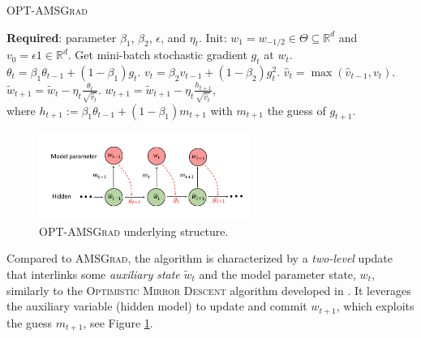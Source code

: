 \documentclass[wcp]{jmlr}
\begin{document}
\hspace{-0.2in}\begin{minipage}{0.5\linewidth}
\begin{algorithm}[H]
\begin{algorithmic}[1] 
\small
\caption{\textsc{OPT-AMSGrad}} \label{alg:optamsgrad}
\STATE \textbf{Required}: parameter $\beta_1$, $\beta_2$, $\epsilon$, and $\eta_t$. 
\STATE Init: $w_1 = w_{-1/2} \in \Theta \subseteq \mathbb R^d $ and $v_{0} = \epsilon 1 \in \mathbb R^{d}$.
\STATE Get mini-batch stochastic gradient $g_t$ at $w_t$.
\STATE $\theta_t = \beta_{1} \theta_{t-1} + (1 - \beta_{1}) g_t$.
\STATE $v_t = \beta_2 v_{t-1} + (1 - \beta_2) g_t^{2}$.
\STATE $\hat{v}_t = \max( \hat{v}_{t-1} , v_t )$. 
\STATE $\tilde{w}_{t+1} =  \tilde{w}_{t} - \eta_t \frac{\theta_t}{ \sqrt{\hat{v}_t }  } $.
\STATE $w_{t+1} = \tilde{w}_{t+1} - \eta_{t} \frac{h_{t+1}}{ \sqrt{\hat{v}_t } } $,  \\  
where $h_{t+1}:= \beta_{1} \theta_{t-1} + (1 - \beta_{1}) m_{t+1}$ with $m_{t+1}$ the guess of $g_{t+1}$. 
\ENDFOR 
\end{algorithmic}
\end{algorithm}\end{minipage}
\hfill
\begin{minipage}{0.5\linewidth}
\begin{figure}[H]
\captionsetup{justification=centering}
    \vspace{-0.1in}
    \includegraphics[width=2.7in]{plots/plot.pdf}
        \vspace{-0.1in}
    \caption{\textsc{OPT-AMSGrad} underlying structure.}
     \label{fig:scheme}
\end{figure}
\end{minipage}

\vspace{0.1in}
Compared to \textsc{AMSGrad}, the algorithm is characterized by a \emph{two-level} update that interlinks some \emph{auxiliary state} $\tilde{w}_{t}$ and the model parameter state, $w_t$, similarly to the \textsc{Optimistic Mirror Descent} algorithm developed in \citep{RS13b}.
It leverages the auxiliary variable (hidden model) to update and commit $w_{t+1}$, which exploits the guess $m_{t+1}$, see Figure \ref{fig:scheme}.
\end{document}
